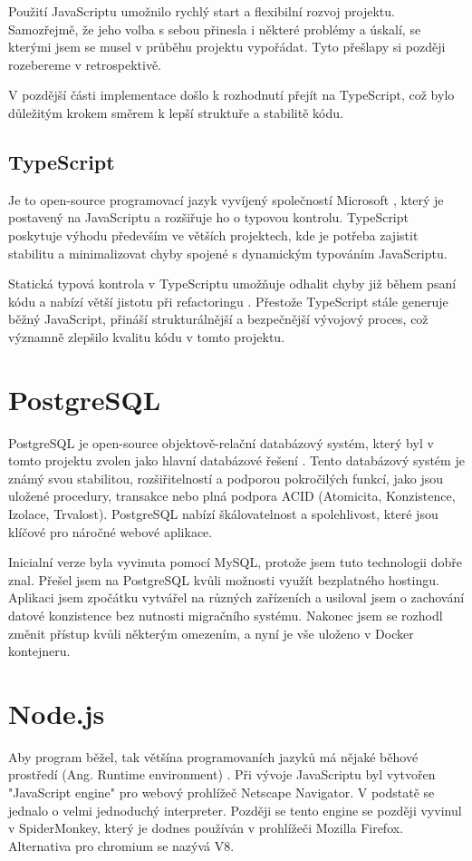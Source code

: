 Použití JavaScriptu umožnilo rychlý start a flexibilní rozvoj projektu. Samozřejmě, že jeho volba s sebou přinesla i některé problémy a úskalí, se kterými jsem se musel v průběhu projektu vypořádat. Tyto přešlapy si později rozebereme v retrospektivě.

V pozdější části implementace došlo k rozhodnutí přejít na TypeScript, což bylo důležitým krokem směrem k lepší struktuře a stabilitě kódu.

\subsection{TypeScript}
Je to open-source programovací jazyk vyvíjený společností Microsoft \cite{enwiki:1261773908}, který je postavený na JavaScriptu a rozšiřuje ho o typovou kontrolu\cite{goldberg2022learning}. TypeScript poskytuje výhodu především ve větších projektech, kde je potřeba zajistit stabilitu a minimalizovat chyby spojené s dynamickým typováním JavaScriptu.

Statická typová kontrola v TypeScriptu umožňuje odhalit chyby již během psaní kódu a nabízí větší jistotu při refactoringu \cite{enwiki:1258410189}. Přestože TypeScript stále generuje běžný JavaScript, přináší strukturálnější a bezpečnější vývojový proces, což významně zlepšilo kvalitu kódu v tomto projektu.

\section{PostgreSQL}
PostgreSQL je open-source objektově-relační databázový systém, který byl v tomto projektu zvolen jako hlavní databázové řešení \cite{postgresqlPostgreSQL}. Tento databázový systém je známý svou stabilitou, rozšiřitelností a podporou pokročilých funkcí, jako jsou uložené procedury, transakce nebo plná podpora ACID (Atomicita, Konzistence, Izolace, Trvalost). PostgreSQL nabízí škálovatelnost a spolehlivost, které jsou klíčové pro náročné webové aplikace.

Inicialní verze byla vyvinuta pomocí MySQL, protože jsem tuto technologii dobře znal. Přešel jsem na PostgreSQL kvůli možnosti využít bezplatného hostingu. Aplikaci jsem zpočátku vytvářel na různých zařízeních a usiloval jsem o zachování datové konzistence bez nutnosti migračního systému. Nakonec jsem se rozhodl změnit přístup kvůli některým omezením, a nyní je vše uloženo v Docker kontejneru.

\section{Node.js}
Aby program běžel, tak většína programovaních jazyků má nějaké běhové prostředí (Ang. Runtime environment) \cite{newJavaScriptEngineModuleOwner}. Při vývoje JavaScriptu byl vytvořen "JavaScript engine" pro webový prohlížeč Netscape Navigator. V podstatě se jednalo o velmi jednoduchý interpreter. Později se tento engine se později vyvinul v SpiderMonkey, který je dodnes používán v prohlížeči Mozilla Firefox\cite{enwiki:1256640147}. Alternativa pro chromium se nazývá V8.

